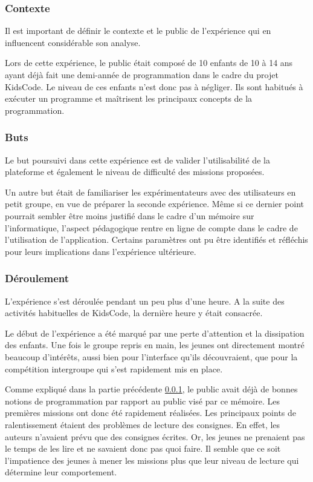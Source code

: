 \subsubsection{Contexte}
\label{context-kidscode}
Il est important de définir le contexte et le public de l'expérience qui en influencent considérable son analyse.

Lors de cette expérience, le public était composé de 10 enfants de 10 à 14 ans ayant déjà fait une demi-année de programmation dans le cadre du projet KidsCode. Le niveau de ces enfants n'est donc pas à négliger. Ils sont habitués à exécuter un programme et maîtrisent les principaux concepts de la programmation.

\subsubsection{Buts}
Le but poursuivi dans cette expérience est de valider l'utilisabilité de la plateforme et également le niveau de difficulté des \glspl{mission} proposées.

Un autre but était de familiariser les expérimentateurs avec des utilisateurs en petit groupe, en vue de préparer la seconde expérience.
Même si ce dernier point pourrait sembler être moins justifié dans le cadre d'un mémoire sur l'informatique, l'aspect pédagogique rentre en ligne de compte dans le cadre de l'utilisation de l'application. Certains paramètres ont pu être identifiés et réfléchis pour leurs implications dans l'expérience ultérieure.

\subsubsection{Déroulement}
L'expérience s'est déroulée pendant un peu plus d'une heure. A la suite des activités habituelles de KidsCode, la dernière heure y était consacrée.

Le début de l'expérience a été marqué par une perte d'attention et la dissipation des enfants. Une fois le groupe repris en main, les jeunes ont directement montré beaucoup d'intérêts, aussi bien pour l'interface qu'ils découvraient, que pour la compétition intergroupe qui s'est rapidement mis en place.

Comme expliqué dans la partie précédente \ref{context-kidscode}, le public avait déjà de bonnes notions de programmation par rapport au public visé par ce mémoire. Les premières \glspl{mission} ont donc été rapidement réalisées. Les principaux points de ralentissement étaient des problèmes de lecture des consignes. En effet, les auteurs n'avaient prévu que des consignes écrites. Or, les jeunes ne prenaient pas le temps de les lire et ne savaient donc pas quoi faire. Il semble que ce soit l'impatience des jeunes à mener les \glspl{mission} plus que leur niveau de lecture qui détermine leur comportement.

